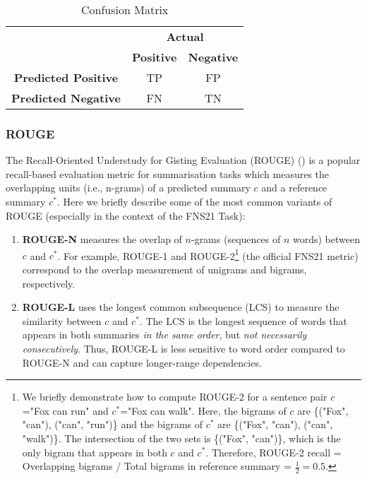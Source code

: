 \begin{table}[ht]
    \centering
    \begin{tabular}{c c c}
        \toprule
        \multirow{2}{*}{} & \multicolumn{2}{c}{\textbf{Actual}} \\
        \cmidrule(lr){2-3}
        & \textbf{Positive} & \textbf{Negative} \\
        \midrule
        \textbf{Predicted Positive} & TP & FP \\
        \textbf{Predicted Negative} & FN & TN \\
        \bottomrule
    \end{tabular}
    \caption{Confusion Matrix}
    \label{tab:confusion_matrix}
\end{table}

\subsubsection{ROUGE}\label{subsubsec:rouge}
The Recall-Oriented Understudy for Gisting Evaluation (ROUGE) (\cite{lin2004rouge}) is a popular recall-based evaluation metric for
summarisation tasks which measures the overlapping units (i.e., n-grams) of a predicted summary $c$ and a reference summary $c^{*}$.
Here we briefly describe some of the most common variants of ROUGE (especially in the context of the FNS21 Task):
\begin{enumerate}
    \item \textbf{ROUGE-N} measures the overlap of $n$-grams (sequences of $n$ words) between $c$ and $c^{*}$.
    For example, ROUGE-1 and ROUGE-2\footnote{
        We briefly demonstrate how to compute ROUGE-2 for a sentence pair $c$="Fox can run" and $c^{*}$="Fox can walk".
        Here, the bigrams of $c$ are \{("Fox", "can"), ("can", "run")\} and the bigrams of $c^{*}$ are \{("Fox", "can"), ("can", "walk")\}.
        The intersection of the two sets is \{("Fox", "can")\}, which is the only bigram that appears in both $c$ and $c^{*}$.
        Therefore, ROUGE-2 recall = Overlapping bigrams / Total bigrams in reference summary = $\frac{1}{2}=0.5$.
    } (the official FNS21 metric) correspond to the overlap measurement of unigrams and bigrams, respectively.
    \item \textbf{ROUGE-L} uses the longest common subsequence (LCS) to measure the similarity between $c$ and $c^{*}$.
    The LCS is the longest sequence of words that appears in both summaries \emph{in the same order}, but \emph{not necessarily consecutively}.
    Thus, ROUGE-L is less sensitive to word order compared to ROUGE-N and can capture longer-range dependencies.
\end{enumerate}

